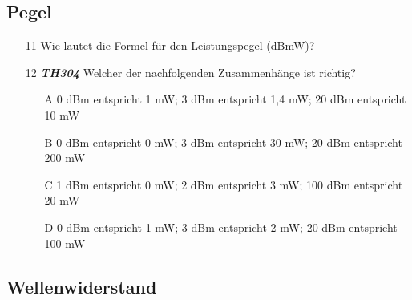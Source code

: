 \subsection*{Pegel}

\begin{enumerate} 
\itemsep1pt\parskip0pt
\item[11] Wie lautet die Formel für den Leistungspegel (dBmW)?
\item[12] \emph{\textbf{TH304}}  Welcher der nachfolgenden Zusammenhänge ist richtig?
	\begin{enumerate}
	\itemsep1pt\parskip0pt
		\item[A] 	0 dBm entspricht 1 mW;
					3 dBm entspricht 1,4 mW;
					20 dBm entspricht 10 mW
		\item[B] 	0 dBm entspricht 0 mW;
					3 dBm entspricht 30 mW;
					20 dBm entspricht 200 mW
		\item[C] 	1 dBm entspricht 0 mW;
					2 dBm entspricht 3 mW;
					100 dBm entspricht 20 mW
		\item[D] 	0 dBm entspricht 1 mW;
					3 dBm entspricht 2 mW;
					20 dBm entspricht 100 mW
	\end{enumerate}
\end{enumerate}

\subsection*{Wellenwiderstand}

